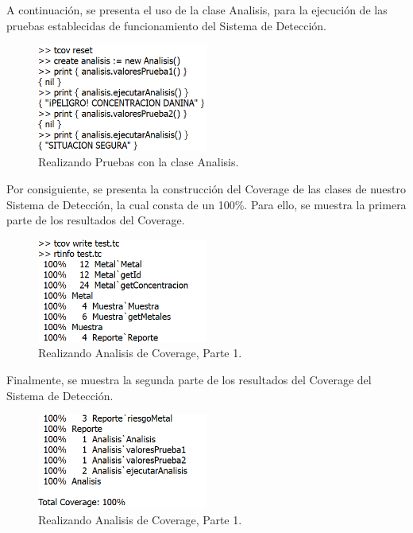 A continuación, se presenta el uso de la clase Analisis, para la ejecución de las pruebas establecidas de funcionamiento del Sistema de Detección.
\begin{figure}[h]
    \centering
    \includegraphics[width=0.5\textwidth]{Recursos/RealizandoPruebas.png}
    \caption{Realizando Pruebas con la clase Analisis.}
\end{figure}


Por consiguiente, se presenta la construcción del Coverage de las clases de nuestro Sistema de Detección, la cual consta de un 100\%. Para ello, se muestra la primera parte de los resultados del Coverage.
\begin{figure}[h]
    \centering
    \includegraphics[width=0.5\textwidth]{Recursos/AnalisisCoverage1.png}
    \caption{Realizando Analisis de Coverage, Parte 1.}
\end{figure}

Finalmente, se muestra la segunda parte de los resultados del Coverage del Sistema de Detección.

\begin{figure}[h]
    \centering
    \includegraphics[width=0.5\textwidth]{Recursos/AnalisisCoverage2.png}
    \caption{Realizando Analisis de Coverage, Parte 1.}
\end{figure}